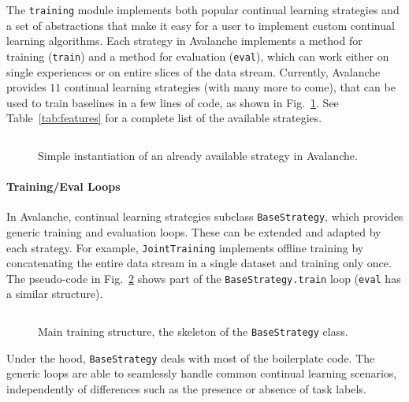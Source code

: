 \documentclass[final]{cvpr}
\theoremstyle{definition}
\newcommand{\codeinline}[1]{\texttt{#1}}
\begin{document}
The \codeinline{training} module implements both popular continual learning strategies and a set of abstractions that make it easy for a user to implement custom continual learning algorithms. Each strategy in Avalanche implements a method for training (\codeinline{train}) and a method for evaluation (\codeinline{eval}), which can work either on single experiences or on entire slices %
of the data stream. Currently, Avalanche provides $11$ continual learning strategies (with many more to come), that can be used to train baselines in a few lines of code, as shown in Fig.~\ref{code:strategies}. See Table~\ref{tab:features} for a complete list of the available strategies.

\begin{figure}[ht]
\begin{tcolorbox}[title={Training Strategies}, colback=mygray]
\inputminted{python}{training_instance.py} 
\end{tcolorbox}
\caption{Simple instantiation of an already available strategy in Avalanche.}
\label{code:strategies}
\end{figure}

\paragraph{Training/Eval Loops} In Avalanche, continual learning strategies subclass \codeinline{BaseStrategy}, which provides generic training and evaluation loops. %
These can be extended and adapted by each strategy. For example, \codeinline{JointTraining} implements offline training by concatenating the entire data stream in a single dataset and training only once. The pseudo-code in Fig.~\ref{code:train-structure} shows part of the \texttt{BaseStrategy.train} loop (\texttt{eval} has a similar structure).

\begin{figure}[ht]
\begin{tcolorbox}[title={Training Structure}, colback=mygray]
\inputminted{python}{pseudo_train.py} 
\end{tcolorbox}
\caption{Main training structure, the skeleton of the \texttt{BaseStrategy} class.}
\label{code:train-structure}
\end{figure}

Under the hood, \codeinline{BaseStrategy} deals with most of the boilerplate code. %
The generic loops are able to seamlessly handle common continual learning scenarios, independently of differences such as the presence or absence of task labels.
\end{document}
